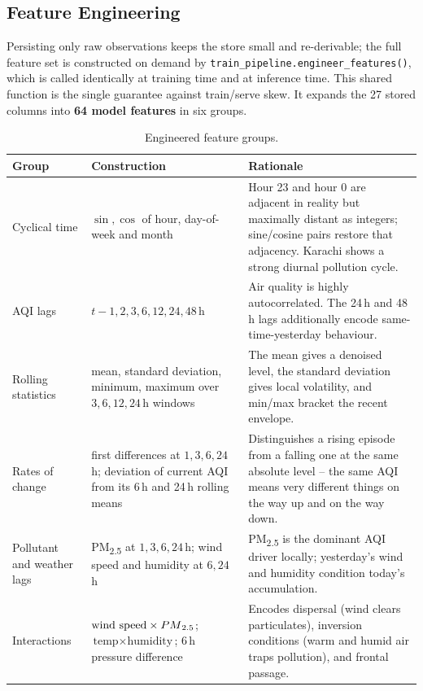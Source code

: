\documentclass[11pt,a4paper]{article}
\newcommand{\pmfine}{PM\textsubscript{2.5}\xspace}
\begin{document}
\subsection{Feature Engineering}

Persisting only raw observations keeps the store small and re-derivable;
the full feature set is constructed on demand by
\texttt{train\_pipeline.engineer\_features()}, which is called identically at
training time and at inference time. This shared function is the single
guarantee against train/serve skew. It expands the 27 stored columns into
\textbf{64 model features} in six groups.

\begin{table}[H]
\centering
\caption{Engineered feature groups.}
\label{tab:features}
\small
\renewcommand{\arraystretch}{1.25}
\begin{tabular}{@{}p{3.5cm}p{4.0cm}p{6.6cm}@{}}
\toprule
\textbf{Group} & \textbf{Construction} & \textbf{Rationale}\\
\midrule
Cyclical time &
$\sin,\cos$ of hour, day-of-week and month &
Hour 23 and hour 0 are adjacent in reality but maximally distant as integers;
sine/cosine pairs restore that adjacency. Karachi shows a strong diurnal
pollution cycle.\\

AQI lags &
$t-1,2,3,6,12,24,48$\,h &
Air quality is highly autocorrelated. The 24\,h and 48\,h lags additionally
encode same-time-yesterday behaviour.\\

Rolling statistics &
mean, standard deviation, minimum, maximum over $3,6,12,24$\,h windows &
The mean gives a denoised level, the standard deviation gives local
volatility, and min/max bracket the recent envelope.\\

Rates of change &
first differences at $1,3,6,24$\,h; deviation of current AQI from its 6\,h and
24\,h rolling means &
Distinguishes a rising episode from a falling one at the same absolute level --
the same AQI means very different things on the way up and on the way down.\\

Pollutant and weather lags &
\pmfine at $1,3,6,24$\,h; wind speed and humidity at $6,24$\,h &
\pmfine is the dominant AQI driver locally; yesterday's wind and humidity
condition today's accumulation.\\

Interactions &
$\text{wind speed}\times\pmfine$;
$\text{temp}\times\text{humidity}$;
6\,h pressure difference &
Encodes dispersal (wind clears particulates), inversion conditions (warm and
humid air traps pollution), and frontal passage.\\
\bottomrule
\end{tabular}
\end{table}
\end{document}
